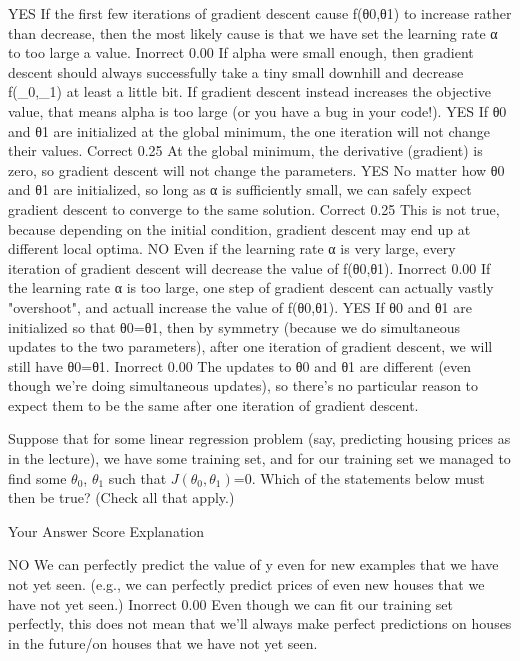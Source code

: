 YES If the first few iterations of gradient descent cause f(θ0,θ1) to increase rather than decrease, then the most likely cause is that we have set the learning rate α to too large a value.	Inorrect	0.00	If alpha were small enough, then gradient descent should always successfully take a tiny small downhill and decrease f(\theta_0,\theta_1) at least a little bit. If gradient descent instead increases the objective value, that means alpha is too large (or you have a bug in your code!).
YES If θ0 and θ1 are initialized at the global minimum, the one iteration will not change their values.	Correct	0.25	At the global minimum, the derivative (gradient) is zero, so gradient descent will not change the parameters.
YES No matter how θ0 and θ1 are initialized, so long as α is sufficiently small, we can safely expect gradient descent to converge to the same solution.	Correct	0.25	This is not true, because depending on the initial condition, gradient descent may end up at different local optima.
NO Even if the learning rate α is very large, every iteration of gradient descent will decrease the value of f(θ0,θ1).	Inorrect	0.00	If the learning rate α is too large, one step of gradient descent can actually vastly "overshoot", and actuall increase the value of f(θ0,θ1).
YES If θ0 and θ1 are initialized so that θ0=θ1, then by symmetry (because we do simultaneous updates to the two parameters), after one iteration of gradient descent, we will still have θ0=θ1.	Inorrect	0.00	The updates to θ0 and θ1 are different (even though we're doing simultaneous updates), so there's no particular reason to expect them to be the same after one iteration of gradient descent.

Suppose that for some linear regression problem (say, predicting housing prices as in the lecture), we have some training set, and for our training set we 
managed to find some $\theta_0$, $\theta_1$ such that $J(\theta_0, \theta_1)$=0. Which of the statements below must then be true? (Check all that apply.)

Your Answer		Score	Explanation

NO We can perfectly predict the value of y even for new examples that we have not yet seen. (e.g., we can perfectly predict prices of even new houses that we have not yet seen.)	Inorrect	0.00	Even though we can fit our training set perfectly, this does not mean that we'll always make perfect predictions on houses in the future/on houses that we have not yet seen.

